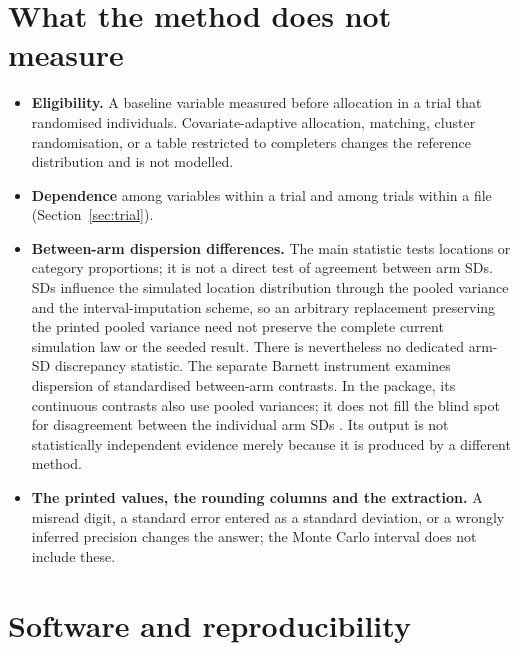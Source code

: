 \documentclass[11pt,a4paper]{article}
\begin{document}
\section{What the method does not measure}
\label{sec:limits}

\begin{itemize}
\item \textbf{Eligibility.} A baseline variable measured before allocation in a trial that randomised individuals. Covariate-adaptive allocation, matching, cluster randomisation, or a table restricted to completers changes the reference distribution and is not modelled.
\item \textbf{Dependence} among variables within a trial and among trials within a file (Section~\ref{sec:trial}).
\item \textbf{Between-arm dispersion differences.} The main statistic tests locations or category proportions; it is not a direct test of agreement between arm SDs. SDs influence the simulated location distribution through the pooled variance and the interval-imputation scheme, so an arbitrary replacement preserving the printed pooled variance need not preserve the complete current simulation law or the seeded result. There is nevertheless no dedicated arm-SD discrepancy statistic. The separate Barnett instrument \citep{barnett2022} examines dispersion of standardised between-arm contrasts. In the package, its continuous contrasts also use pooled variances; it does not fill the blind spot for disagreement between the individual arm SDs \citep{audit2026sep08}. Its output is not statistically independent evidence merely because it is produced by a different method.
\item \textbf{The printed values, the rounding columns and the extraction.} A misread digit, a standard error entered as a standard deviation, or a wrongly inferred precision changes the answer; the Monte Carlo interval does not include these.
\end{itemize}

\section{Software and reproducibility}
\label{sec:software}
\end{document}
